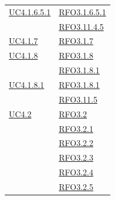 \begin{itemize}
\begin{itemize}
\begin{itemize}
\begin{itemize}
\begin{longtable}{|>{\centering}m{5cm}|m{5cm}<{\centering}|}
\hyperref[UC4.1.6.5.1]{UC4.1.6.5.1} & \hyperlink{RFO3.1.6.5.1}{RFO3.1.6.5.1}\\ & \hyperlink{RFO3.11.4.5}{RFO3.11.4.5}\\ \hline
\hyperref[UC4.1.7]{UC4.1.7} & \hyperlink{RFO3.1.7}{RFO3.1.7}\\ \hline
\hyperref[UC4.1.8]{UC4.1.8} & \hyperlink{RFO3.1.8}{RFO3.1.8}\\
& \hyperlink{RFO3.1.8.1}{RFO3.1.8.1}\\ \hline
\hyperref[UC4.1.8.1]{UC4.1.8.1} & \hyperlink{RFO3.1.8.1}{RFO3.1.8.1}\\
& \hyperlink{RFO3.11.5}{RFO3.11.5}\\ \hline

\hyperref[UC4.2]{UC4.2} & \hyperlink{RFO3.2}{RFO3.2}\\
& \hyperlink{RFO3.2.1}{RFO3.2.1}\\
& \hyperlink{RFO3.2.2}{RFO3.2.2}\\
& \hyperlink{RFO3.2.3}{RFO3.2.3}\\
& \hyperlink{RFO3.2.4}{RFO3.2.4}\\
& \hyperlink{RFO3.2.5}{RFO3.2.5}\\


\end{longtable}
\end{itemize}
\end{itemize}
\end{itemize}
\end{itemize}
